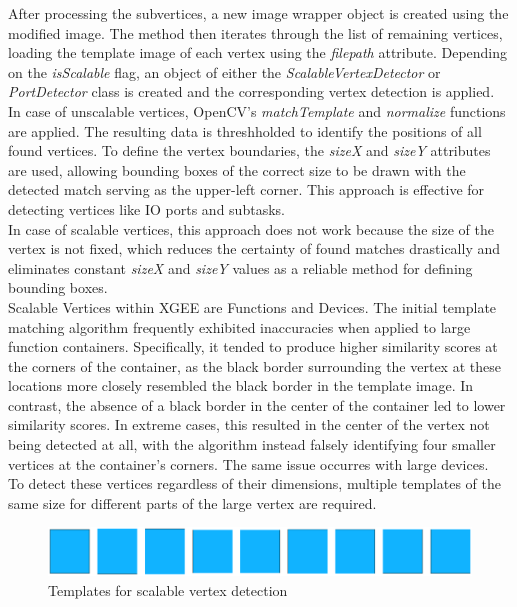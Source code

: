After processing the subvertices, a new image wrapper object is created using the modified image. The method then iterates through the list of remaining vertices, loading the template image of each vertex using the \textit{filepath} attribute. Depending on the \textit{isScalable} flag, an object of either the \textit{ScalableVertexDetector} or \textit{PortDetector} class is created and the corresponding vertex detection is applied.\\
In case of unscalable vertices, OpenCV's \textit{matchTemplate} and \textit{normalize} functions are applied. The resulting data is threshholded to identify the positions of all found vertices. To define the vertex boundaries, the \textit{sizeX} and \textit{sizeY} attributes are used, allowing bounding boxes of the correct size to be drawn with the detected match serving as the upper-left corner. This approach is effective for detecting vertices like IO ports and subtasks.\\
In case of scalable vertices, this approach does not work because the size of the vertex is not fixed, which reduces the certainty of found matches drastically and eliminates constant \textit{sizeX} and \textit{sizeY} values as a reliable method for defining bounding boxes.\\
Scalable Vertices within XGEE are Functions and Devices.
The initial template matching algorithm frequently exhibited inaccuracies when applied to large function containers. Specifically, it tended to produce higher similarity scores at the corners of the container, as the black border surrounding the vertex at these locations more closely resembled the black border in the template image. In contrast, the absence of a black border in the center of the container led to lower similarity scores. In extreme cases, this resulted in the center of the vertex not being detected at all, with the algorithm instead falsely identifying four smaller vertices at the container's corners. The same issue occurres with large devices.\\
To detect these vertices regardless of their dimensions, multiple templates of the same size for different parts of the large vertex are required.
\begin{figure}[h]
    \centering
    \includegraphics[width=0.8\linewidth]{Pictures/templates.png}
    \caption{Templates for scalable vertex detection}
    \label{fig_templates}
\end{figure}
